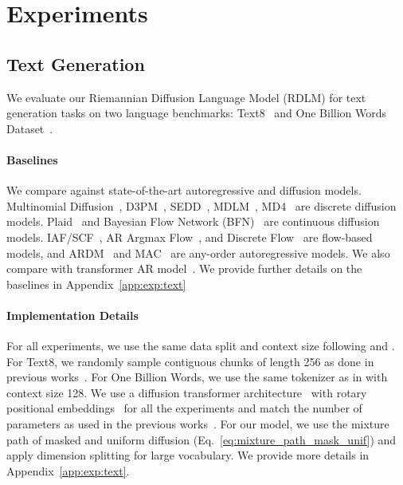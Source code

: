 

\section{Experiments}

\subsection{Text Generation}
We evaluate our Riemannian Diffusion Language Model (RDLM) for text generation tasks on two language benchmarks: Text8~\citep{data_text8} and One Billion Words Dataset~\citep{chelba2013one}.

\paragraph{Baselines}
We compare against state-of-the-art autoregressive and diffusion models. Multinomial Diffusion~\citep{hoogeboom2021multinomial}, D3PM~\citep{austin2021d3pm}, SEDD~\citep{lou2024sedd}, MDLM~\citep{sahoo2024simple}, MD4~\citep{shi2024md4} are discrete diffusion models. Plaid~\citep{gulrajani2024plaid} and Bayesian Flow Network (BFN)~\citep{graves2023bayesian} are continuous diffusion models. 
IAF/SCF~\citep{ziegler2019iaf}, AR Argmax Flow~\citep{hoogeboom2021multinomial}, and Discrete Flow~\citep{tran2019discrete} are flow-based models, and ARDM~\citep{hoogeboom2022autoregressive} and MAC~\citep{shih2022ardm} are any-order autoregressive models. 
We also compare with transformer AR model~\citep{vaswani2017transformer}.
We provide further details on the baselines in Appendix~\ref{app:exp:text}





\paragraph{Implementation Details}
For all experiments, we use the same data split and context size following \citet{lou2024sedd} and \citet{sahoo2024simple}. For Text8, we randomly sample contiguous chunks of length 256 as done in previous works~\citep{austin2021d3pm,lou2024sedd}.
For One Billion Words, we use the same tokenizer as in \citet{he2023diffusionbert} with context size 128.
We use a diffusion transformer architecture~\citep{peebles2023dit} with rotary positional embeddings~\citep{su2024roformer} for all the experiments and match the number of parameters as used in the previous works~\citep{lou2024sedd,sahoo2024simple}.
For our model, we use the mixture path of masked and uniform diffusion (Eq.~\eqref{eq:mixture_path_mask_unif}) and apply dimension splitting for large vocabulary.
We provide more details in Appendix~\ref{app:exp:text}.


